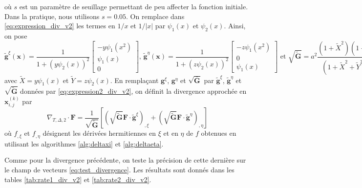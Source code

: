 où $s$ est un paramètre de seuillage permettant de peu affecter la fonction initiale. Dans la pratique, nous utilisons $s=0.05$. On remplace dans \eqref{eq:expression_div_v2} les termes en $1/x$ et $1/|x|$ par $\psi_1(x)$ et $\psi_2(x)$. Ainsi, on pose
\begin{equation}
\tilde{\mathbf{g}}^{\xi} (\mathbf{x} ) = \dfrac{1}{1 + (y\psi_2(x))^2} \begin{bmatrix}
- y\psi_1(x^2) \\
\psi_1(x) \\
0
\end{bmatrix} \text{, }
\tilde{\mathbf{g}}^{\eta} (\mathbf{x} ) = \dfrac{1}{1 + (z\psi_2(x))^2} \begin{bmatrix}
- z\psi_1(x^2) \\
0 \\
\psi_1(x)
\end{bmatrix}
 \text{ et } \sqrt{\tilde{\mathbf{G}}} = a^2 \dfrac{(1+\tilde{X}^2)(1+ \tilde{Y}^2)}{(1+\tilde{X}^2+\tilde{Y}^2)^{3/2}}
\label{eq:expression2_div_v2}
\end{equation}
avec $\tilde{X}=y \psi_1(x)$ et $\tilde{Y} = z \psi_2(x)$.
En remplaçant $\mathbf{g}^{\xi}$, $\mathbf{g}^{\eta}$ et $\sqrt{\bar{\mathbf{G}}}$ par $\tilde{\mathbf{g}}^{\xi}$, $\tilde{\mathbf{g}}^{\eta}$ et $\sqrt{\tilde{\mathbf{G}}}$ données par \eqref{eq:expression2_div_v2}, on définit la divergence approchée en $\mathbf{x}_{i,j}^{(k)}$ par
\begin{equation}
\nabla_{T,\Delta,2} \cdot \mathbf{F} = \dfrac{1}{\sqrt{\tilde{\mathbf{G}}}} \left[ \left( \sqrt{\tilde{\mathbf{G}}} \mathbf{F} \cdot \tilde{\mathbf{g}}^{\xi} \right)_{,\xi} + 
\left( \sqrt{\tilde{\mathbf{G}}} \mathbf{F} \cdot \tilde{\mathbf{g}}^{\eta} \right)_{,\eta}
\right]
\end{equation}
où $f_{,\xi}$ et $f_{,\eta}$ désignent les dérivées hermitiennes en $\xi$ et en $\eta$ de $f$ obtenues en utilisant les algorithmes \ref{alg:deltaxi} et \ref{alg:deltaeta}. 

Comme pour la divergence précédente, on teste la précision de cette dernière sur le champ de vecteurs \eqref{eq:test_divergence}. Les résultats sont donnés dans les tables \ref{tab:rate1_div_v2} et \ref{tab:rate2_div_v2}.

